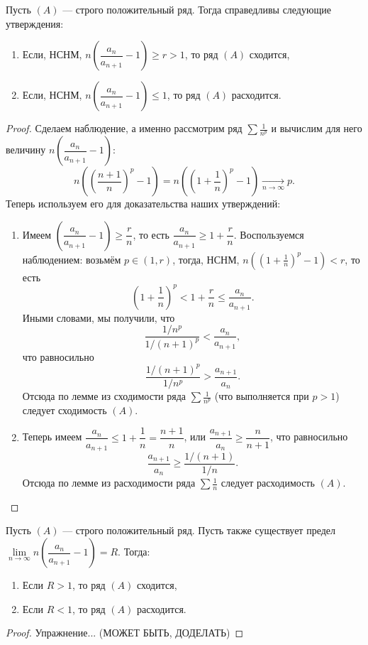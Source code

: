 \begin{theorem}[noob]
	Пусть \((A)\) --- строго положительный ряд. Тогда справедливы следующие утверждения:
	\begin{enumerate}
		\item Если, НСНМ, \(n \left(\dfrac{a_n}{a_{n+1}} - 1 \right) \geqslant r > 1\), то ряд \((A)\) сходится,
		\item Если, НСНМ, \(n \left(\dfrac{a_n}{a_{n+1}} - 1 \right) \leqslant 1\), то ряд \((A)\) расходится.
	\end{enumerate}
\end{theorem}
\begin{proof}
	Сделаем наблюдение, а именно рассмотрим ряд \(\sum \frac{1}{n^p}\) и вычислим для него величину \(n \left(\dfrac{a_n}{a_{n+1}} - 1 \right)\): \[
	n \left(\left(\frac{n + 1}{n} \right)^p - 1 \right) = n \left(\left(1 + \frac{1}{n}\right)^p - 1 \right) \xrightarrow[n \to \infty]{} p.
	\]
	Теперь используем его для доказательства наших утверждений:
	\begin{enumerate}
		\item Имеем \(\left(\dfrac{a_n}{a_{n+1}} - 1 \right) \geqslant \dfrac{r}{n}\), то есть \(\dfrac{a_n}{a_{n+1}} \geqslant 1 + \dfrac{r}{n}\). Воспользуемся наблюдением: возьмём \(p \in (1, r)\), тогда, НСНМ, \(n \left(\left(1 + \frac{1}{n}\right)^p - 1 \right) < r\), то есть \[
		\left(1 + \frac{1}{n}\right)^p < 1 + \frac{r}{n} \leqslant \dfrac{a_n}{a_{n+1}}.
		\]
		Иными словами, мы получили, что  \[
		\frac{1/n^p}{1/(n + 1)^p} < \frac{a_n}{a_{n+1}},
		\]
		что равносильно \[
		\frac{1/(n + 1)^p}{1/n^p} > \frac{a_{n+1}}{a_n}.
		\]
		Отсюда по лемме из сходимости ряда \(\sum \frac{1}{n^p}\) (что выполняется при \(p > 1\)) следует сходимость \((A)\).
		\item Теперь имеем \(\dfrac{a_n}{a_{n+1}} \leqslant 1 + \dfrac{1}{n} = \dfrac{n + 1}{n}\), или \(\dfrac{a_{n+1}}{a_n} \geqslant \dfrac{n}{n + 1}\), что равносильно \[
		\frac{a_{n+1}}{a_n} \geqslant \frac{1/(n + 1)}{1/n}.
		\]
		Отсюда по лемме из расходимости ряда \(\sum \frac{1}{n}\) следует расходимость \((A)\).
	\end{enumerate}
\end{proof}

\begin{corollary}
	Пусть \((A)\) --- строго положительный ряд. Пусть также существует предел \(\lim\limits_{n \to \infty} n \left(\dfrac{a_n}{a_{n+1}} - 1 \right) = R\). Тогда:
	\begin{enumerate}
		\item Если \(R > 1\), то ряд \((A)\) сходится,
		\item Если \(R < 1\), то ряд \((A)\) расходится.
	\end{enumerate}
\end{corollary}
\begin{proof}
	Упражнение... (МОЖЕТ БЫТЬ,  ДОДЕЛАТЬ)
\end{proof}

